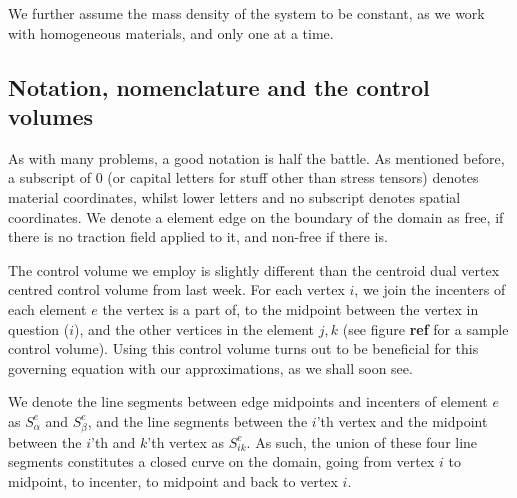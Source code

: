 \documentclass[sigconf]{acmart}
\begin{document}
We further assume the mass density of the system to be constant, as we work with homogeneous materials, and only one at a time. 

\subsection{Notation, nomenclature and the control volumes}
As with many problems, a good notation is half the battle. As mentioned before, a subscript of 0 (or capital letters for stuff other than stress tensors) denotes material coordinates, whilst lower letters and no subscript denotes spatial coordinates. We denote a element edge on the boundary of the domain as free, if there is no traction field applied to it, and non-free if there is.

The control volume we employ is slightly different than the centroid dual vertex centred control volume from last week. For each vertex $ i $, we join the incenters of each element $ e $ the vertex is a part of, to the midpoint between the vertex in question ($ i $), and the other vertices in the element $ j,k $ (see figure \textbf{ref} for a sample control volume). Using this control volume turns out to be beneficial for this governing equation with our approximations, as we shall soon see.

We denote the line segments between edge midpoints and incenters of element $ e $ as $ S^e_{\alpha} $ and $ S^e_{\beta} $, and the line segments between the $ i $'th vertex and the midpoint between the $ i $'th and $ k $'th vertex as $ S^e_{ik} $. As such, the union of these four line segments constitutes a closed curve on the domain, going from vertex $ i $ to midpoint, to incenter, to midpoint and back to vertex $ i $.
\end{document}

